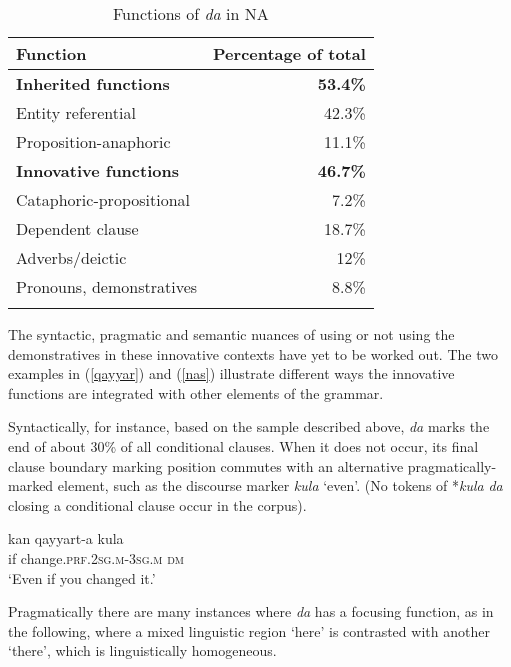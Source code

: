 \documentclass[output=paper]{langsci/langscibook}
\begin{document}
\begin{table}\begin{tabularx}{.67\textwidth}{lr}
\lsptoprule
Function & Percentage of total\\
\midrule
\bfseries Inherited functions & \bfseries 53.4\%\\
        \hspace{5mm}Entity referential  & 42.3\%\\
        \hspace{5mm}Proposition-anaphoric  & 11.1\%\\
\addlinespace
\bfseries Innovative functions & \bfseries 46.7\%\\
        \hspace{5mm}Cataphoric-propositional & 7.2\%\\
        \hspace{5mm}Dependent clause & 18.7\%\\
        \hspace{5mm}Adverbs/deictic & 12\%\\
        \hspace{5mm}Pronouns, {demonstratives} & 8.8\%\\
\lspbottomrule
\end{tabularx}
\caption{
\label{bkm:Ref520915528}Functions of \textit{da} in NA
}
\label{tab:funct}
\end{table}


The syntactic, pragmatic and semantic nuances of using or not using the dem\-onstratives in these innovative contexts have yet to be worked out. The two examples in (\ref{qayyar}) and (\ref{nas}) illustrate different ways the innovative functions are integrated with other elements of the grammar.

Syntactically, for instance, based on the sample described above, \textit{da} marks the end of about 30\% of all {conditional} clauses. When it does not occur, its final clause boundary marking position commutes with an alternative pragmatically-marked element, such as the discourse marker \textit{kula} ‘even’. (No tokens of *\textit{kula} \textit{da} closing a {conditional} clause occur in the corpus).

\ea\label{qayyar}
\gll kan qayyart-a kula\\
     if change.\textsc{prf.2sg.m-3sg.m} \textsc{dm}\\
\glt ‘Even if you changed it.’
\z

Pragmatically there are many instances where \textit{da} has a {focusing} function, as in the following, where a mixed linguistic region ‘here’ is contrasted with another ‘there’, which is linguistically homogeneous.
\end{document}
